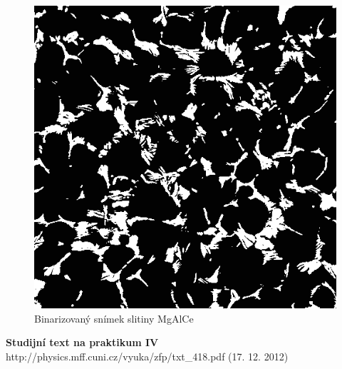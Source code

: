 \documentclass[a4paper,12pt]{article}
\begin{document}
\begin{figure}[!htb]
\begin{center}
\includegraphics[scale=.7]{B5.png}
\end{center}
\caption{Binarizovaný snímek slitiny MgAlCe}
\label{o5}
\end{figure}

\begin{thebibliography}{5}
	 \textbf{Studijní text na praktikum IV} \\http://physics.mff.cuni.cz/vyuka/zfp/txt\_418.pdf (17. 12. 2012)
\end{thebibliography}
\end{document}
